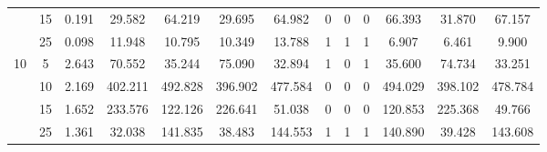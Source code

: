 \documentclass[11pt]{article}
\theoremstyle{definition}
\begin{document}
\begin{sidewaysfigure}
\begin{tabular}{cc|cc|ccc|ccc|ccc}
  & 15 & 0.191 & 29.582 & 64.219 & 29.695 & 64.982 & 0  & 0  & 0  & 66.393 & 31.870 & 67.157 \\ 
   & 25 & 0.098 & 11.948 & 10.795 & 10.349 & 13.788 & 1  & 1  & 1  & 6.907 & 6.461 & 9.900 \\[.3cm]  
\multirow{4}{*}{10} &  5 & 2.643 & 70.552 & 35.244 & 75.090 & 32.894 & 1  & 0  & 1  & 35.600 & 74.734 & 33.251 \\ 
   & 10 & 2.169 & 402.211 & 492.828 & 396.902 & 477.584 & 0  & 0  & 0  & 494.029 & 398.102 & 478.784 \\ 
   & 15 & 1.652 & 233.576 & 122.126 & 226.641 & 51.038 & 0  & 0  & 0  & 120.853 & 225.368 & 49.766 \\ 
   & 25 & 1.361 & 32.038 & 141.835 & 38.483 & 144.553 & 1  & 1  & 1  & 140.890 & 39.428 & 143.608 \\ 
\end{tabular}
\end{sidewaysfigure}
\end{document}
